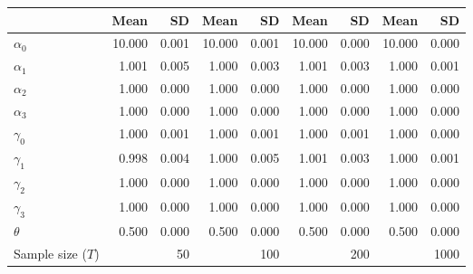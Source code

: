 
\begin{tabular}[t]{lrrrrrrrr}
\toprule
  & Mean & SD & Mean  & SD  & Mean   & SD   & Mean    & SD   \\
\midrule
$\alpha_{0}$ & 10.000 & 0.001 & 10.000 & 0.001 & 10.000 & 0.000 & 10.000 & 0.000\\
$\alpha_{1}$ & 1.001 & 0.005 & 1.000 & 0.003 & 1.001 & 0.003 & 1.000 & 0.001\\
$\alpha_{2}$ & 1.000 & 0.000 & 1.000 & 0.000 & 1.000 & 0.000 & 1.000 & 0.000\\
$\alpha_{3}$ & 1.000 & 0.000 & 1.000 & 0.000 & 1.000 & 0.000 & 1.000 & 0.000\\
$\gamma_{0}$ & 1.000 & 0.001 & 1.000 & 0.001 & 1.000 & 0.001 & 1.000 & 0.000\\
$\gamma_{1}$ & 0.998 & 0.004 & 1.000 & 0.005 & 1.001 & 0.003 & 1.000 & 0.001\\
$\gamma_{2}$ & 1.000 & 0.000 & 1.000 & 0.000 & 1.000 & 0.000 & 1.000 & 0.000\\
$\gamma_{3}$ & 1.000 & 0.000 & 1.000 & 0.000 & 1.000 & 0.000 & 1.000 & 0.000\\
$\theta$ & 0.500 & 0.000 & 0.500 & 0.000 & 0.500 & 0.000 & 0.500 & 0.000\\
Sample size ($T$) &  & 50 &  & 100 &  & 200 &  & 1000\\
\bottomrule
\end{tabular}

